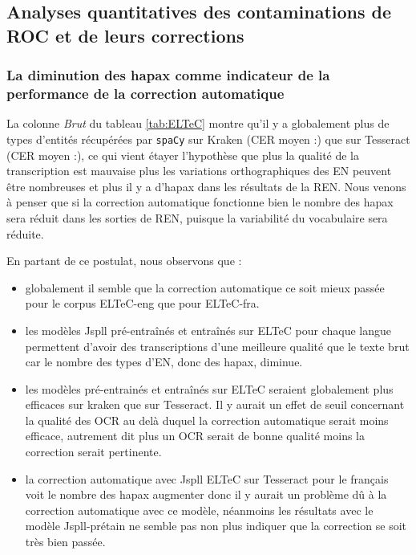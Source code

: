 %    


\subsection{Analyses quantitatives des contaminations de ROC et de leurs corrections}
\label{subsec:quantitative_COR-OCR-IMPACT-NER}
\subsubsection{La diminution des hapax comme indicateur de la performance de la correction automatique}
La colonne \textit{Brut} du tableau \ref{tab:ELTeC} montre qu'il y a globalement plus de types d'entités récupérées par \texttt{spaCy} sur Kraken (CER moyen :) que sur Tesseract (CER moyen :), ce qui vient étayer l'hypothèse que plus la qualité de la transcription est mauvaise plus les variations orthographiques des EN peuvent être nombreuses et plus il y a d'hapax dans les résultats de la REN. Nous venons à penser que si la correction automatique fonctionne bien le nombre des hapax sera réduit dans les sorties de REN, puisque la variabilité du vocabulaire sera réduite.

En partant de ce postulat, nous observons que :
\begin{itemize}
\item globalement il semble que la correction automatique ce soit mieux passée pour le corpus ELTeC-eng que pour ELTeC-fra.
\item les modèles Jspll pré-entraînés et entraînés sur ELTeC pour chaque langue permettent d'avoir des transcriptions d'une meilleure qualité que le texte brut car le nombre des types d'EN, donc des hapax, diminue.
\item les modèles pré-entrainés  et entraînés sur ELTeC seraient globalement plus efficaces sur kraken que sur Tesseract. Il y aurait un effet de seuil concernant la qualité des OCR au delà duquel la correction automatique serait moins efficace, autrement dit plus un OCR serait de bonne qualité moins la correction serait pertinente. 
\item la correction automatique avec Jspll ELTeC sur Tesseract pour le français voit le nombre des hapax augmenter donc il y aurait un problème dû à la correction automatique avec ce modèle, néanmoins les résultats avec le modèle Jspll-prétain ne semble pas non plus indiquer que la correction se soit très bien passée.
\end{itemize}
 
